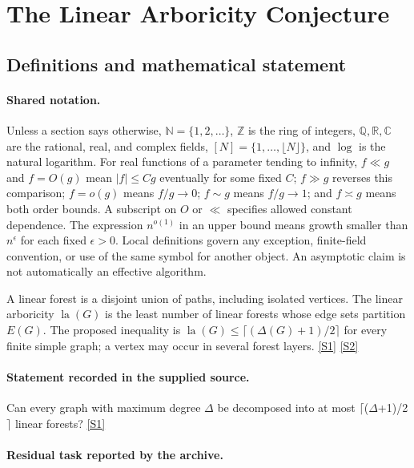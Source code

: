 \documentclass[11pt,a4paper]{article}
\newcommand{\N}{\mathbb{N}}
\newcommand{\Z}{\mathbb{Z}}
\newcommand{\Q}{\mathbb{Q}}
\newcommand{\R}{\mathbb{R}}
\newcommand{\C}{\mathbb{C}}
\newcommand{\sref}[2]{\hyperlink{source:#1:#2}{[S#2]}}
\begin{document}
\section{The Linear Arboricity Conjecture}\label{statement}


\subsection{Definitions and mathematical statement}

\paragraph{Shared notation.}Unless a section says otherwise, $\N=\{1,2,\ldots\}$,
$\Z$ is the ring of integers, $\Q,\R,\C$ are the rational, real, and complex
fields, $[N]=\{1,\ldots,\lfloor N\rfloor\}$, and $\log$ is the natural
logarithm. For real functions of a parameter tending to infinity,
$f\ll g$ and $f=O(g)$ mean $|f|\leq Cg$ eventually for some fixed $C$;
$f\gg g$ reverses this comparison; $f=o(g)$ means $f/g\to0$;
$f\sim g$ means $f/g\to1$; and $f\asymp g$ means both order bounds.
A subscript on $O$ or $\ll$ specifies allowed constant dependence.
The expression $n^{o(1)}$ in an upper bound means growth smaller than
$n^\epsilon$ for each fixed $\epsilon>0$. Local definitions govern any
exception, finite-field convention, or use of the same symbol for another
object. An asymptotic claim is not automatically an effective algorithm.



A linear forest is a disjoint union of paths, including isolated vertices. The linear arboricity $\operatorname{la}(G)$ is the least number of linear forests whose edge sets partition $E(G)$. The proposed inequality is $\operatorname{la}(G)\leq\lceil(\Delta(G)+1)/2\rceil$ for every finite simple graph; a vertex may occur in several forest layers. \sref{statement}{1} \sref{statement}{2}

\paragraph{Statement recorded in the supplied source.}
Can every graph with maximum degree \ensuremath{Δ} be decomposed into at most \ensuremath{⌈}(\ensuremath{Δ}+1)/2\ensuremath{⌉} linear forests? \sref{statement}{1}

\paragraph{Residual task reported by the archive.}
\end{document}
